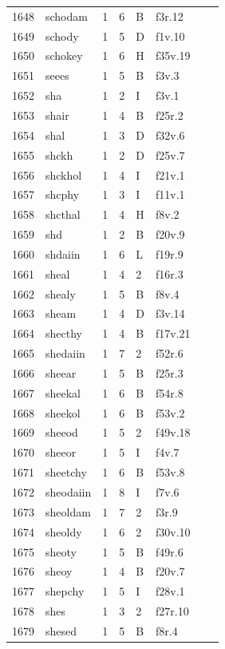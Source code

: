 \documentclass[11pt,a4paper]{article}
\begin{document}
\begin{landscape}
\begin{longtable}{@{}r>{\ttfamily}lrrl>{\ttfamily}l>{\raggedright\arraybackslash}p{80mm}>{\raggedright\arraybackslash}p{36mm}@{}}
1648 & schodam & 1 & 6 & B & f3r.12 &  & \\
1649 & schody & 1 & 5 & D & f1v.10 &  & \\
1650 & schokey & 1 & 6 & H & f35v.19 &  & \\
1651 & seees & 1 & 5 & B & f3v.3 &  & \\
1652 & sha & 1 & 2 & I & f3v.1 &  & \\
1653 & shair & 1 & 4 & B & f25r.2 &  & \\
1654 & shal & 1 & 3 & D & f32v.6 &  & \\
1655 & shckh & 1 & 2 & D & f25v.7 &  & \\
1656 & shckhol & 1 & 4 & I & f21v.1 &  & \\
1657 & shcphy & 1 & 3 & I & f11v.1 &  & \\
1658 & shcthal & 1 & 4 & H & f8v.2 &  & \\
1659 & shd & 1 & 2 & B & f20v.9 &  & \\
1660 & shdaiin & 1 & 6 & L & f19r.9 &  & \\
1661 & sheal & 1 & 4 & 2 & f16r.3 &  & \\
1662 & shealy & 1 & 5 & B & f8v.4 &  & \\
1663 & sheam & 1 & 4 & D & f3v.14 &  & \\
1664 & shecthy & 1 & 4 & B & f17v.21 &  & \\
1665 & shedaiin & 1 & 7 & 2 & f52r.6 &  & \\
1666 & sheear & 1 & 5 & B & f25r.3 &  & \\
1667 & sheekal & 1 & 6 & B & f54r.8 &  & \\
1668 & sheekol & 1 & 6 & B & f53v.2 &  & \\
1669 & sheeod & 1 & 5 & 2 & f49v.18 &  & \\
1670 & sheeor & 1 & 5 & I & f4v.7 &  & \\
1671 & sheetchy & 1 & 6 & B & f53v.8 &  & \\
1672 & sheodaiin & 1 & 8 & I & f7v.6 &  & \\
1673 & sheoldam & 1 & 7 & 2 & f3r.9 &  & \\
1674 & sheoldy & 1 & 6 & 2 & f30v.10 &  & \\
1675 & sheoty & 1 & 5 & B & f49r.6 &  & \\
1676 & sheoy & 1 & 4 & B & f20v.7 &  & \\
1677 & shepchy & 1 & 5 & I & f28v.1 &  & \\
1678 & shes & 1 & 3 & 2 & f27r.10 &  & \\
1679 & shesed & 1 & 5 & B & f8r.4 &  & \\

\end{longtable}
\end{landscape}
\end{document}
